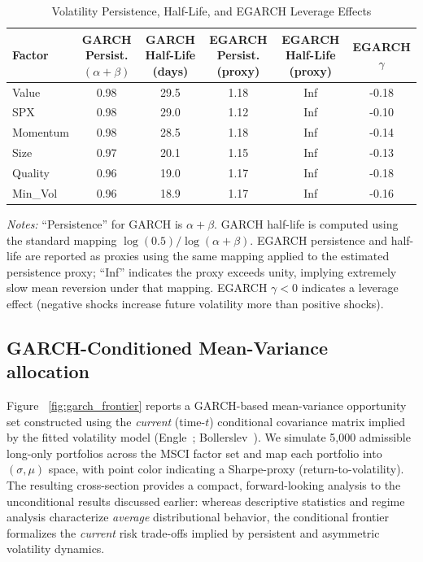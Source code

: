 \documentclass{article}
\begin{document}
\begin{landscape}
\begin{table}[!htbp]
\centering
\caption{Volatility Persistence, Half-Life, and EGARCH Leverage Effects}
\label{tab:persist_leverage}
\small
\begin{tabular}{lccccc}
\toprule
Factor & GARCH Persist. $(\alpha+\beta)$ & GARCH Half-Life (days) & EGARCH Persist. (proxy) & EGARCH Half-Life (proxy) & EGARCH $\gamma$ \\
\midrule
Value    & 0.98 & 29.5 & 1.18 & Inf & -0.18 \\
SPX      & 0.98 & 29.0 & 1.12 & Inf & -0.10 \\
Momentum & 0.98 & 28.5 & 1.18 & Inf & -0.14 \\
Size     & 0.97 & 20.1 & 1.15 & Inf & -0.13 \\
Quality  & 0.96 & 19.0 & 1.17 & Inf & -0.18 \\
Min\_Vol & 0.96 & 18.9 & 1.17 & Inf & -0.16 \\
\bottomrule
\end{tabular}
\vspace{4pt}
\footnotesize
\emph{Notes:} ``Persistence'' for GARCH is $\alpha+\beta$. GARCH half-life is computed using the standard mapping $\log(0.5)/\log(\alpha+\beta)$. EGARCH persistence and half-life are reported as proxies using the same mapping applied to the estimated persistence proxy; ``Inf'' indicates the proxy exceeds unity, implying extremely slow mean reversion under that mapping. EGARCH $\gamma<0$ indicates a leverage effect (negative shocks increase future volatility more than positive shocks).
\end{table}
\end{landscape}

\subsection{GARCH-Conditioned Mean-Variance allocation}

Figure ~\ref{fig:garch_frontier} reports a GARCH-based mean-variance opportunity set constructed using the \emph{current} (time-$t$) conditional covariance matrix implied by the fitted volatility model (Engle~\cite{engle1982}; Bollerslev~\cite{bollerslev1986}). We simulate 5,000 admissible long-only portfolios across the MSCI factor set and map each portfolio into $(\sigma,\mu)$ space, with point color indicating a Sharpe-proxy (return-to-volatility). The resulting cross-section provides a compact, forward-looking analysis to the unconditional results discussed earlier: whereas descriptive statistics and regime analysis characterize \emph{average} distributional behavior, the conditional frontier formalizes the \emph{current} risk trade-offs implied by persistent and asymmetric volatility dynamics.
\end{document}
